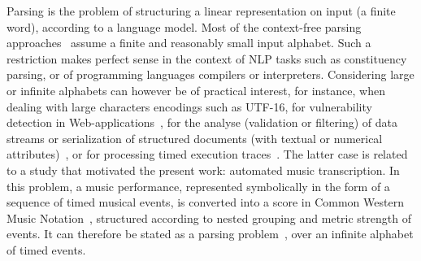 %
Parsing %
is the problem %
of structuring a linear representation on input %
(a finite word), according to a language model. %
%
Most of the context-free parsing approaches~\cite{GruneJacobs08parsing}  
assume a finite and reasonably small input alphabet. %
Such a restriction makes perfect sense in the context of NLP tasks such as constituency parsing,
or of programming languages compilers or interpreters.
Considering large or infinite alphabets can however be of practical interest, %
%
for instance, when dealing with large characters encodings such as UTF-16, %
\eg for vulnerability detection in Web-applications~\cite{dAntoni21CACM}, 
%
for the analyse (\eg validation or filtering) 
of data streams or serialization of structured documents 
(with textual or numerical attributes)~\cite{Segoufin06csl}, 
or for processing timed execution traces~\cite{Bouyer03algebraic}.
%
The latter case is related to a study that motivated the present work: 
automated music transcription.
In this problem, a music performance, %
represented symbolically in the form of a sequence of timed musical events, %
is converted into a score in Common Western Music Notation~\cite{Gould11Notation},
structured according to nested grouping and metric strength of events.
It can therefore be stated as a parsing problem~\cite{foscarin:hal-01988990}, 
over an infinite alphabet of timed events.

